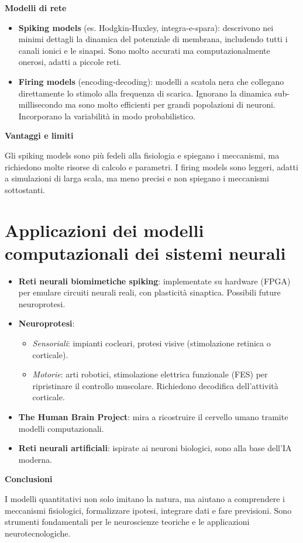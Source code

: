 \documentclass[12pt,a4paper,openany]{book}
\begin{document}
\textbf{Modelli di rete}

\begin{itemize}
  \item \textbf{Spiking models} (es. Hodgkin-Huxley, integra-e-spara): descrivono nei minimi dettagli la dinamica del potenziale di membrana, includendo tutti i canali ionici e le sinapsi. Sono molto accurati ma computazionalmente onerosi, adatti a piccole reti.
  \item \textbf{Firing models} (encoding-decoding): modelli a scatola nera che collegano direttamente lo stimolo alla frequenza di scarica. Ignorano la dinamica sub-millisecondo ma sono molto efficienti per grandi popolazioni di neuroni. Incorporano la variabilità in modo probabilistico.
\end{itemize}

\textbf{Vantaggi e limiti}

Gli spiking models sono più fedeli alla fisiologia e spiegano i meccanismi, ma richiedono molte risorse di calcolo e parametri. I firing models sono leggeri, adatti a simulazioni di larga scala, ma meno precisi e non spiegano i meccanismi sottostanti.

\section{Applicazioni dei modelli computazionali dei sistemi neurali}

\begin{itemize}
  \item \textbf{Reti neurali biomimetiche spiking}: implementate su hardware (FPGA) per emulare circuiti neurali reali, con plasticità sinaptica. Possibili future neuroprotesi.
  \item \textbf{Neuroprotesi}:
    \begin{itemize}
      \item \textit{Sensoriali}: impianti cocleari, protesi visive (stimolazione retinica o corticale).
      \item \textit{Motorie}: arti robotici, stimolazione elettrica funzionale (FES) per ripristinare il controllo muscolare. Richiedono decodifica dell'attività corticale.
    \end{itemize}
  \item \textbf{The Human Brain Project}: mira a ricostruire il cervello umano tramite modelli computazionali.
  \item \textbf{Reti neurali artificiali}: ispirate ai neuroni biologici, sono alla base dell'IA moderna.
\end{itemize}

\textbf{Conclusioni}

I modelli quantitativi non solo imitano la natura, ma aiutano a comprendere i meccanismi fisiologici, formalizzare ipotesi, integrare dati e fare previsioni. Sono strumenti fondamentali per le neuroscienze teoriche e le applicazioni neurotecnologiche.
\end{document}
